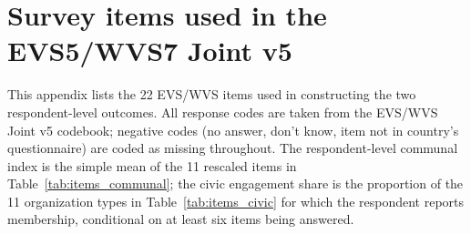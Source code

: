 
\appendix
\section{Survey items used in the EVS5/WVS7 Joint v5}
\label{app:items}

This appendix lists the 22 EVS/WVS items used in constructing the two
respondent-level outcomes. All response codes are taken from the EVS/WVS Joint
v5 codebook; negative codes (no answer, don't know, item not in country's
questionnaire) are coded as missing throughout. The respondent-level communal
index is the simple mean of the 11 rescaled items in Table~\ref{tab:items_communal};
the civic engagement share is the proportion of the 11 organization types in
Table~\ref{tab:items_civic} for which the respondent reports membership, conditional
on at least six items being answered.

